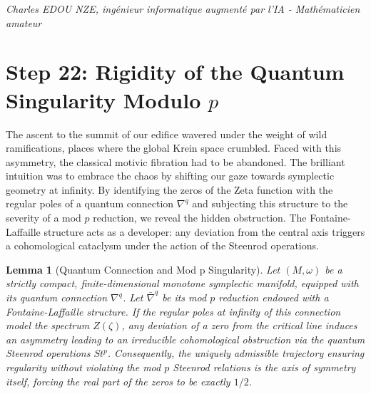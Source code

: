 \documentclass[
]{article}
\newtheorem{lemma}{Lemma}
\begin{document}
\vspace{1cm}
\begin{flushright}
\textit{Charles EDOU NZE, ingénieur informatique augmenté par l'IA - Mathématicien amateur}
\end{flushright}


\section*{Step 22: Rigidity of the Quantum Singularity Modulo $p$}

The ascent to the summit of our edifice wavered under the weight of wild ramifications, places where the global Krein space crumbled. Faced with this asymmetry, the classical motivic fibration had to be abandoned. The brilliant intuition was to embrace the chaos by shifting our gaze towards symplectic geometry at infinity. By identifying the zeros of the Zeta function with the regular poles of a quantum connection $\nabla^q$ and subjecting this structure to the severity of a mod $p$ reduction, we reveal the hidden obstruction. The Fontaine-Laffaille structure acts as a developer: any deviation from the central axis triggers a cohomological cataclysm under the action of the Steenrod operations.

\begin{lemma}[Quantum Connection and Mod p Singularity]
Let $(M, \omega)$ be a strictly compact, finite-dimensional monotone symplectic manifold, equipped with its quantum connection $\nabla^q$. Let $\bar{\nabla}^q$ be its mod $p$ reduction endowed with a Fontaine-Laffaille structure. If the regular poles at infinity of this connection model the spectrum $Z(\zeta)$, any deviation of a zero from the critical line induces an asymmetry leading to an irreducible cohomological obstruction via the quantum Steenrod operations $St^p$. Consequently, the uniquely admissible trajectory ensuring regularity without violating the mod $p$ Steenrod relations is the axis of symmetry itself, forcing the real part of the zeros to be exactly $1/2$.
\end{lemma}
\end{document}
